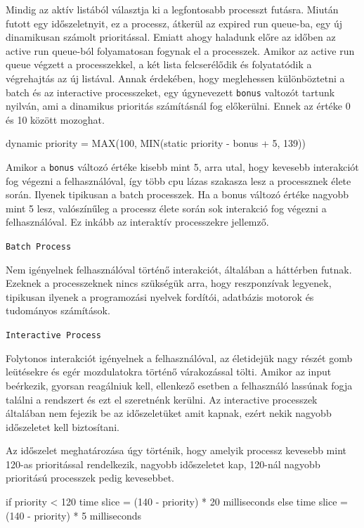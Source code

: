 Mindig az aktív listából választja ki a legfontosabb processzt futásra. Miután futott egy időszeletnyit, ez a processz, átkerül az expired run queue-ba, egy új dinamikusan számolt prioritással.
Emiatt ahogy haladunk előre az időben az active run queue-ból folyamatosan fogynak el a processzek.  Amikor az active run queue végzett a processzekkel, a két lista felcserélődik és folyatatódik a végrehajtás az új listával.
Annak érdekében, hogy meglehessen különböztetni a batch és az interactive processzeket, egy úgynevezett \texttt{bonus} valtozót tartunk nyilván, ami a dinamikus prioritás számításnál fog előkerülni. Ennek az értéke 0 és 10 között mozoghat.
\begin{cpp}
dynamic priority = MAX(100, MIN(static priority - bonus + 5, 139))
\end{cpp}
Amikor a \texttt{bonus} változó értéke kisebb mint 5, arra utal, hogy kevesebb interakciót fog végezni a felhasználóval, így több cpu lázas szakasza lesz a processznek élete során. Ilyenek tipikusan a batch processzek.
Ha a bonus változó értéke nagyobb mint 5 lesz, valószínűleg a processz élete során sok interakció fog végezni a felhasználóval. Ez inkább az interaktív processzekre jellemző.

\noindent\texttt{Batch Process} 

\setlength{\leftskip}{1cm}

\noindent Nem igényelnek felhasználóval történő interakciót, általában a háttérben futnak. Ezeknek a processzeknek nincs szükségük arra, hogy reszponzívak legyenek, tipikusan ilyenek a programozási nyelvek fordítói, adatbázis motorok és tudományos számítások.

\setlength{\leftskip}{0pt}

\noindent\texttt{Interactive Process}

\setlength{\leftskip}{1cm}

\noindent Folytonos interakciót igényelnek a felhasználóval, az életidejük nagy részét gomb leütésekre és egér mozdulatokra történő várakozással tölti.
Amikor az input beérkezik, gyorsan reagálniuk kell, ellenkező esetben a felhasználó lassúnak fogja találni a rendszert és ezt el szeretnénk kerülni.
Az interactive processzek általában nem fejezik be az időszeletüket amit kapnak, ezért nekik nagyobb időszeletet kell biztosítani. 

\setlength{\leftskip}{0pt}

Az időszelet meghatározása úgy történik, hogy amelyik processz kevesebb mint 120-as prioritással rendelkezik, nagyobb időszeletet kap, 120-nál nagyobb prioritású processzek pedig kevesebbet.
\begin{cpp}
if priority < 120 
	time slice = (140 - priority) * 20    milliseconds 
else
	time slice = (140 - priority) * 5   milliseconds 
\end{cpp}


